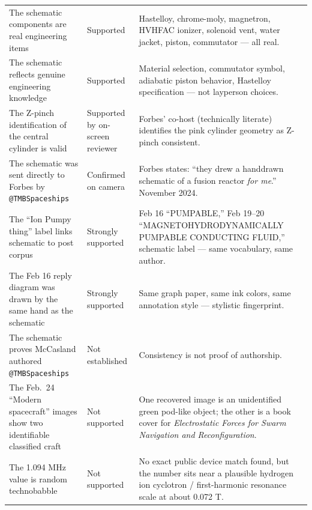 \documentclass[11pt]{article}
\makeatletter
\newcommand{\account}{\texttt{@TMBSpaceships}}
\makeatother
\begin{document}
\begin{longtable}{@{}>{\raggedright\arraybackslash}p{} >{\raggedright\arraybackslash}p{} >{\raggedright\arraybackslash}p{}@{}}
The schematic components are real engineering items & Supported & Hastelloy, chrome-moly, magnetron, HVHFAC ionizer, solenoid vent, water jacket, piston, commutator — all real. \\[4pt]
The schematic reflects genuine engineering knowledge & Supported & Material selection, commutator symbol, adiabatic piston behavior, Hastelloy specification — not layperson choices. \\[4pt]
The Z-pinch identification of the central cylinder is valid & Supported by on-screen reviewer & Forbes' co-host (technically literate) identifies the pink cylinder geometry as Z-pinch consistent. \\[4pt]
The schematic was sent directly to Forbes by \account & Confirmed on camera & Forbes states: ``they drew a handdrawn schematic of a fusion reactor \emph{for me}.'' November 2024. \\[4pt]
The ``Ion Pumpy thing'' label links schematic to post corpus & Strongly supported & Feb 16 ``PUMPABLE,'' Feb 19--20 ``MAGNETOHYDRODYNAMICALLY PUMPABLE CONDUCTING FLUID,'' schematic label — same vocabulary, same author. \\[4pt]
The Feb 16 reply diagram was drawn by the same hand as the schematic & Strongly supported & Same graph paper, same ink colors, same annotation style — stylistic fingerprint. \\[4pt]
The schematic proves McCasland authored \account & Not established & Consistency is not proof of authorship. \\[4pt]
The Feb.\ 24 ``Modern spacecraft'' images show two identifiable classified craft & Not supported & One recovered image is an unidentified green pod-like object; the other is a book cover for \textit{Electrostatic Forces for Swarm Navigation and Reconfiguration}. \\[4pt]
The 1.094 MHz value is random technobabble & Not supported & No exact public device match found, but the number sits near a plausible hydrogen ion cyclotron / first-harmonic resonance scale at about 0.072 T. \\[4pt]


\end{longtable}
\end{document}

